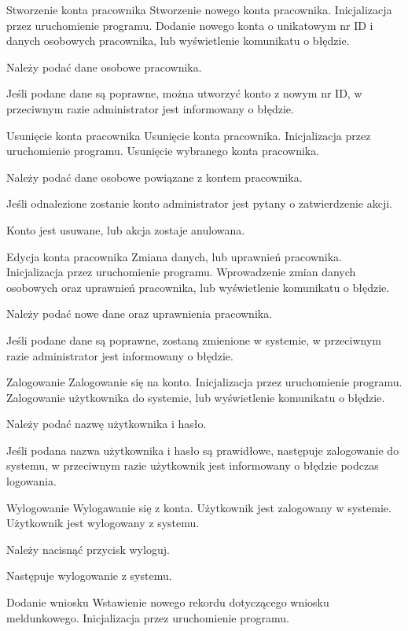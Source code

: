 \documentclass[12pt]{article}
\begin{document}
\scenario
    {Stworzenie konta pracownika}
    {Stworzenie nowego konta pracownika.}
    {Inicjalizacja przez uruchomienie programu.}
    {Dodanie nowego konta o unikatowym nr ID i danych osobowych pracownika, lub wyświetlenie komunikatu o błędzie.}
    {
        \item Należy podać dane osobowe pracownika.
        \item Jeśli podane dane są poprawne, można utworzyć konto z nowym nr ID, w przeciwnym razie administrator jest informowany o błędzie.
    }
\scenario
    {Usunięcie konta pracownika}
    {Usunięcie konta pracownika.}
    {Inicjalizacja przez uruchomienie programu.}
    {Usunięcie wybranego konta pracownika.}
    {
        \item Należy podać dane osobowe powiązane z kontem pracownika.
        \item Jeśli odnalezione zostanie konto administrator jest pytany o zatwierdzenie akcji.
        \item Konto jest usuwane, lub akcja zostaje anulowana.
    }
\scenario
    {Edycja konta pracownika}
    {Zmiana danych, lub uprawnień pracownika.}
    {Inicjalizacja przez uruchomienie programu.}
    {Wprowadzenie zmian danych osobowych oraz uprawnień pracownika, lub wyświetlenie komunikatu o błędzie.}
    {
        \item Należy podać nowe dane oraz uprawnienia pracownika.
        \item Jeśli podane dane są poprawne, zostaną zmienione w systemie, w przeciwnym razie administrator jest informowany o błędzie.
    }
\scenario
    {Zalogowanie}
    {Zalogowanie się na konto.}
    {Inicjalizacja przez uruchomienie programu.}
    {Zalogowanie użytkownika do systemie, lub wyświetlenie komunikatu o błędzie.}
    {
        \item Należy podać nazwę użytkownika i hasło.
        \item Jeśli podana nazwa użytkownika i hasło są prawidłowe, następuje zalogowanie do systemu, w przeciwnym razie użytkownik jest informowany o błędzie podczas logowania.
    }
\scenario
    {Wylogowanie}
    {Wylogawanie się z konta.}
    {Użytkownik jest zalogowany w systemie. }
    {Użytkownik jest wylogowany z systemu.}
    {
        \item Należy nacisnąć przycisk wyloguj.
        \item Następuje wylogowanie z systemu.
    }
\scenario
    {Dodanie wniosku}
    {Wstawienie nowego rekordu dotyczącego wniosku meldunkowego.}
    {Inicjalizacja przez uruchomienie programu.}
\end{document}
